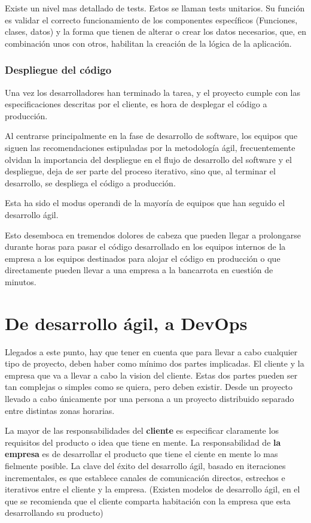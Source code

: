 \documentclass[12pt]{report} %
\begin{document}
Existe un nivel mas detallado de tests.
Estos se llaman tests unitarios.
Su función es validar el correcto funcionamiento de los componentes específicos (Funciones, clases, datos) y la forma  que tienen de alterar o crear los datos necesarios, que, en combinación unos con otros, habilitan la creación de la lógica de la aplicación.

\subsubsection{Despliegue del código}

Una vez los desarrolladores han terminado la tarea, y el proyecto cumple con las especificaciones descritas por el cliente, es hora de desplegar el código a producción.

Al centrarse principalmente en la fase de desarrollo de software, los equipos que siguen las recomendaciones estipuladas por la metodología ágil, frecuentemente olvidan la importancia del despliegue en el flujo de desarrollo del software y el despliegue, deja de ser parte del proceso iterativo, sino que, al terminar el desarrollo, se despliega el código a producción.

Esta ha sido el modus operandi de la mayoría de equipos que han seguido el desarrollo ágil.

Esto desemboca en tremendos dolores de cabeza que pueden llegar a prolongarse durante horas para pasar el código desarrollado en los equipos internos de la empresa a los equipos destinados para alojar el código en producción o que directamente pueden llevar a una empresa a la bancarrota en cuestión de minutos. \cite{seven2014}

\section{De desarrollo ágil, a DevOps}

Llegados a este punto, hay que tener en cuenta que para llevar a cabo cualquier tipo de proyecto, deben haber como mínimo dos partes implicadas.
El cliente y la empresa que va a llevar a cabo la vision del cliente.
Estas dos partes pueden ser tan complejas o simples como se quiera, pero deben existir.
Desde un proyecto llevado a cabo únicamente por una persona a un proyecto distribuido separado entre distintas zonas horarias.

La mayor de las responsabilidades del \textbf{cliente} es especificar claramente los requisitos del producto o idea que tiene en mente.
La responsabilidad de \textbf{la empresa} es de desarrollar el producto que tiene el ciente en mente lo mas fielmente posible.
La clave del éxito del desarrollo ágil, basado en iteraciones incrementales, es que establece canales de comunicación directos, estrechos e iterativos entre el cliente y la empresa.
(Existen modelos de desarrollo ágil, en el que se recomienda que el cliente comparta habitación con la empresa que esta desarrollando su producto)
\end{document}
